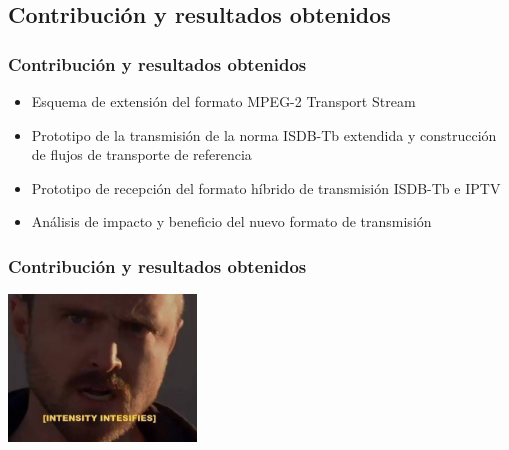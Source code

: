 \documentclass[a4paper,11pt]{beamer}
\begin{document}
	\subsection{Contribución y resultados obtenidos}
	\begin{frame}
		\frametitle{Contribución y resultados obtenidos}
		\begin{itemize}
			\item Esquema de extensión del formato MPEG-2 Transport Stream
			\item Prototipo de la transmisión de la norma ISDB-Tb extendida y construcción de flujos de transporte de referencia
			\item Prototipo de recepción del formato híbrido de transmisión ISDB-Tb e IPTV
			\item Análisis de impacto y beneficio del nuevo formato de transmisión
		\end{itemize}
	\end{frame}


	\begin{frame}
		\frametitle{Contribución y resultados obtenidos}
		\begin{center}
			\includegraphics[width=5cm]{closed_caption.jpg}
		\end{center}
	\end{frame}
\end{document}
